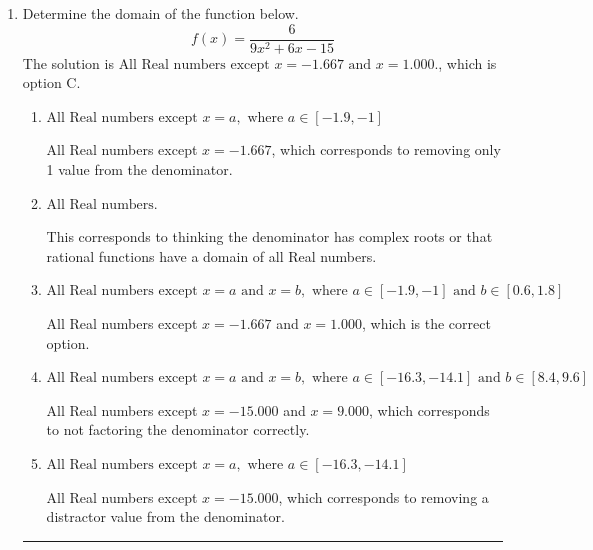 \documentclass{extbook}[14pt]
\newcommand{\litem}[1]{\item #1

\rule{\textwidth}{0.4pt}}
\begin{document}
\begin{enumerate}\litem{
Determine the domain of the function below.
\[ f(x) = \frac{6}{9x^{2} +6 x -15} \]The solution is \( \text{All Real numbers except } x = -1.667 \text{ and } x = 1.000. \), which is option C.\begin{enumerate}[label=\Alph*.]
\item \( \text{All Real numbers except } x = a, \text{ where } a \in [-1.9, -1] \)

All Real numbers except $x = -1.667$, which corresponds to removing only 1 value from the denominator.
\item \( \text{All Real numbers.} \)

This corresponds to thinking the denominator has complex roots or that rational functions have a domain of all Real numbers.
\item \( \text{All Real numbers except } x = a \text{ and } x = b, \text{ where } a \in [-1.9, -1] \text{ and } b \in [0.6, 1.8] \)

All Real numbers except $x = -1.667$ and $x = 1.000$, which is the correct option.
\item \( \text{All Real numbers except } x = a \text{ and } x = b, \text{ where } a \in [-16.3, -14.1] \text{ and } b \in [8.4, 9.6] \)

All Real numbers except $x = -15.000$ and $x = 9.000$, which corresponds to not factoring the denominator correctly.
\item \( \text{All Real numbers except } x = a, \text{ where } a \in [-16.3, -14.1] \)

All Real numbers except $x = -15.000$, which corresponds to removing a distractor value from the denominator.
\end{enumerate}

}
\end{enumerate}
\end{document}
